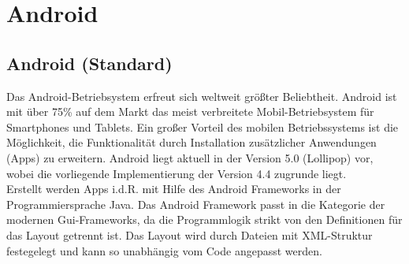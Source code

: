 \newpage
\section{Android} \label{sec:hauptteil_android}

\subsection{Android (Standard)}
Das Android-Betriebsystem erfreut sich weltweit größter Beliebtheit. Android ist mit über 
75\% auf dem Markt das meist verbreitete Mobil-Betriebsystem für Smartphones und Tablets. 
Ein großer Vorteil des mobilen Betriebssystems ist die Möglichkeit, die Funktionalität 
durch Installation zusätzlicher Anwendungen (Apps) zu erweitern. Android liegt aktuell
in der Version 5.0 (Lollipop) vor, wobei die vorliegende Implementierung der Version
4.4 zugrunde liegt.
\\[0.5cm]
Erstellt werden Apps i.d.R. mit Hilfe des Android Frameworks in der Programmiersprache Java. 
Das Android Framework passt in die Kategorie der modernen Gui-Frameworks, da die Programmlogik
strikt von den Definitionen für das Layout getrennt ist. Das Layout wird durch Dateien mit
XML-Struktur festegelegt und kann so unabhängig vom Code angepasst werden.

